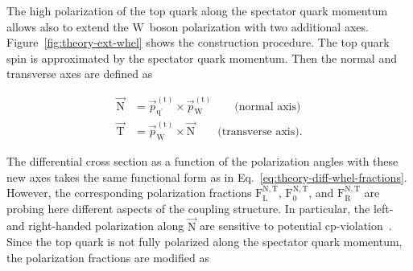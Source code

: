 The high polarization of the top quark along the spectator quark momentum allows also to extend the $\mathrm{W}$~boson polarization with two additional axes. Figure~\ref{fig:theory-ext-whel} shows the construction procedure. The top quark spin is approximated by the spectator quark momentum. Then the normal and transverse axes are defined as 

\begin{subequations}
\begin{align}
\vec{\mathrm{N}}&=\vec{p}_{\mathrm{q}^\prime}^{\mathrm{(t)}}\times\vec{p}_{\mathrm{W}}^{\mathrm{(t)}}\qquad\text{(normal axis)} \\
\vec{\mathrm{T}}&=\vec{p}_{\mathrm{W}}^{\mathrm{(t)}}\times \vec{\mathrm{N}}\qquad\text{(transverse axis)}.
\end{align}
\end{subequations}


The differential cross section as a function of the polarization angles with these new axes takes the same functional form as in Eq.~\ref{eq:theory-diff-whel-fractions}. However, the corresponding polarization fractions $\mathrm{F}_\mathrm{L}^\mathrm{N,T}$, $\mathrm{F}_\mathrm{0}^\mathrm{N,T}$, and $\mathrm{F}_\mathrm{R}^\mathrm{N,T}$ are probing here different aspects of the coupling structure. In particular, the left- and right-handed polarization along $\vec{\mathrm{N}}$ are sensitive to potential \gls{cp}-violation~\cite{AguilarSaavedra:2010nx}. Since the top quark is not fully polarized along the spectator quark momentum, the  polarization fractions are modified as

